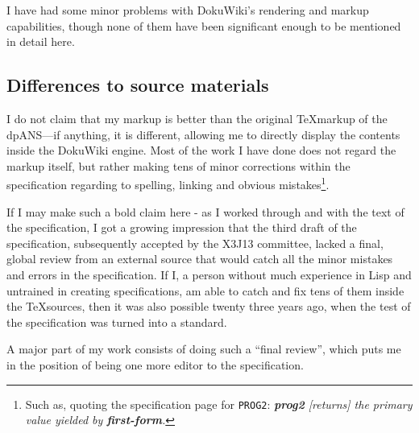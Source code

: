 I have had some minor problems with DokuWiki's rendering and markup capabilities, though none of them have been significant enough to be mentioned in detail here.

\subsection{Differences to source materials}

I do not claim that my markup is better than the original \TeX markup of the dpANS---if anything, it is different, allowing me to directly display the contents inside the DokuWiki engine. Most of the work I have done does not regard the markup itself, but rather making tens of minor corrections within the specification regarding to spelling, linking and obvious mistakes\footnote{Such as, quoting the specification page for \texttt{PROG2}: \textit{\textbf{prog2} [returns] the primary value yielded by \textbf{first-form}.}}.

If I may make such a bold claim here - as I worked through and with the text of the specification, I got a growing impression that the third draft of the specification, subsequently accepted by the X3J13 committee, lacked a final, global review from an external source that would catch all the minor mistakes and errors in the specification. If I, a person without much experience in Lisp and untrained in creating specifications, am able to catch and fix tens of them inside the \TeX sources, then it was also possible twenty three years ago, when the test of the specification was turned into a standard.

A major part of my work consists of doing such a ``final review'', which puts me in the position of being one more editor to the \cl{} specification.

